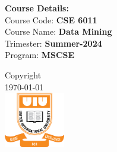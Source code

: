 \documentclass[12pt]{book} %
\begin{document}
\begin{titlepage}
\begin{minipage}{0.4\textwidth}
    \vspace{.1cm}

    \begin{flushright}
        \textbf{Course Details:} \\
        \vspace{0.2cm}
        Course Code: \textbf{CSE 6011}\\
        Course Name: \textbf{Data Mining}\\
        Trimester: \textbf{Summer-2024}\\
        Program: \textbf{MSCSE}
    \end{flushright}
\end{minipage}
    
\vspace{2cm}
    
    
    



\ifx
\textregistered\textcopyright
\sffamily\textregistered\textcopyright
\fi

Copyright\\
\today\\[1cm]

\includegraphics[width=100px]{assets/uiu-logo.png}\\[1cm] %
 

\vfill %

\end{titlepage}
\end{document}
